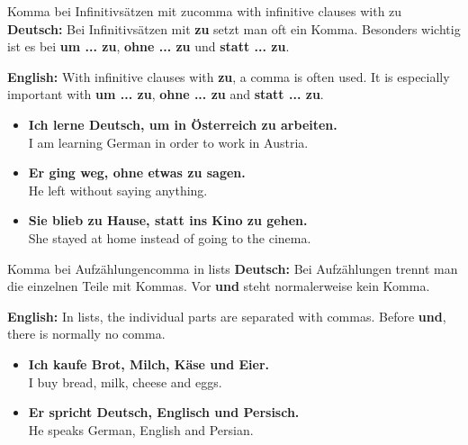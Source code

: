 \documentclass[a4paper,11pt]{article}
\newcommand{\GermanText}[1]{\textbf{Deutsch: }#1\par}
\newcommand{\EnglishText}[1]{{\small\color{SoftGray}\textbf{English: }#1\par}}
\newcommand{\ExampleItem}[2]{\item \textbf{#1}\\{\small\color{SoftGray}#2}}
\begin{document}
        \begin{grammarentry}{Komma bei Infinitivsätzen mit zu}{comma with infinitive clauses with zu}
            \GermanText{Bei Infinitivsätzen mit \textbf{zu} setzt man oft ein Komma. Besonders wichtig ist es bei \textbf{um ... zu}, \textbf{ohne ... zu} und \textbf{statt ... zu}.}
            \EnglishText{With infinitive clauses with \textbf{zu}, a comma is often used. It is especially important with \textbf{um ... zu}, \textbf{ohne ... zu} and \textbf{statt ... zu}.}
            
            \begin{exbox}
                \begin{itemize}
                    \ExampleItem{Ich lerne Deutsch, um in Österreich zu arbeiten.}{I am learning German in order to work in Austria.}
                    \ExampleItem{Er ging weg, ohne etwas zu sagen.}{He left without saying anything.}
                    \ExampleItem{Sie blieb zu Hause, statt ins Kino zu gehen.}{She stayed at home instead of going to the cinema.}
                \end{itemize}
            \end{exbox}
        \end{grammarentry}
        
        \begin{grammarentry}{Komma bei Aufzählungen}{comma in lists}
            \GermanText{Bei Aufzählungen trennt man die einzelnen Teile mit Kommas. Vor \textbf{und} steht normalerweise kein Komma.}
            \EnglishText{In lists, the individual parts are separated with commas. Before \textbf{und}, there is normally no comma.}
            
            \begin{exbox}
                \begin{itemize}
                    \ExampleItem{Ich kaufe Brot, Milch, Käse und Eier.}{I buy bread, milk, cheese and eggs.}
                    \ExampleItem{Er spricht Deutsch, Englisch und Persisch.}{He speaks German, English and Persian.}
                \end{itemize}
            \end{exbox}
        \end{grammarentry}
        
\end{document}
